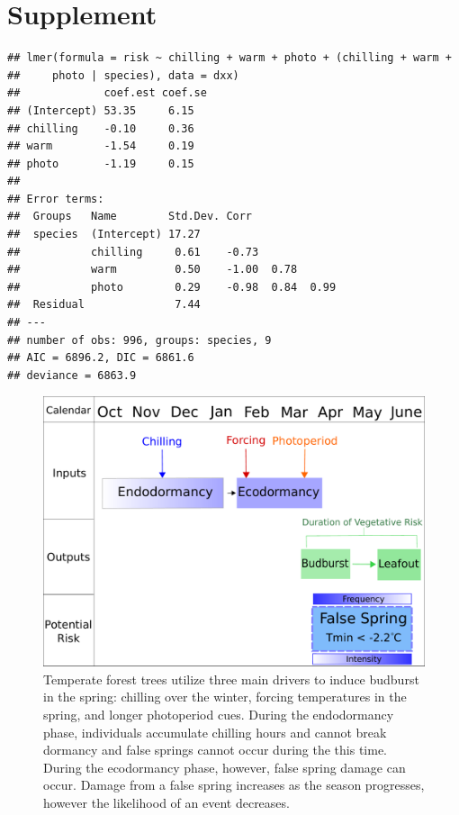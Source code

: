 \documentclass{article}\usepackage[]{graphicx}\usepackage[]{color}
\makeatletter
\newenvironment{kframe}{%
 \def\at@end@of@kframe{}%
 \ifinner\ifhmode%
  \def\at@end@of@kframe{\end{minipage}}%
  \begin{minipage}{\columnwidth}%
 \fi\fi%
 \def\FrameCommand##1{\hskip\@totalleftmargin \hskip-\fboxsep
 \colorbox{shadecolor}{##1}\hskip-\fboxsep
     \hskip-\linewidth \hskip-\@totalleftmargin \hskip\columnwidth}%
 \MakeFramed {\advance\hsize-\width
   \@totalleftmargin\z@ \linewidth\hsize
   \@setminipage}}%
 {\par\unskip\endMakeFramed%
 \at@end@of@kframe}
\newenvironment{knitrout}{}{} %
\makeatother
\begin{document}
\section*{Supplement}
\begin{knitrout}
\color{fgcolor}\begin{kframe}
\begin{verbatim}
## lmer(formula = risk ~ chilling + warm + photo + (chilling + warm + 
##     photo | species), data = dxx)
##             coef.est coef.se
## (Intercept) 53.35     6.15  
## chilling    -0.10     0.36  
## warm        -1.54     0.19  
## photo       -1.19     0.15  
## 
## Error terms:
##  Groups   Name        Std.Dev. Corr              
##  species  (Intercept) 17.27                      
##           chilling     0.61    -0.73             
##           warm         0.50    -1.00  0.78       
##           photo        0.29    -0.98  0.84  0.99 
##  Residual              7.44                      
## ---
## number of obs: 996, groups: species, 9
## AIC = 6896.2, DIC = 6861.6
## deviance = 6863.9
\end{verbatim}
\end{kframe}
\end{knitrout}

\begin{figure} [H] 
\begin{center}
\includegraphics{..//figure/CuesAndFS.pdf}
\caption{Temperate forest trees utilize three main drivers to induce budburst in the spring: chilling over the winter, forcing temperatures in the spring, and longer photoperiod cues. During the endodormancy phase, individuals accumulate chilling hours and cannot break dormancy and false springs cannot occur during the this time. During the ecodormancy phase, however, false spring damage can occur. Damage from a false spring increases as the season progresses, however the likelihood of an event decreases.}\label{fig:cues}
\end{center}
\end{figure}
\end{document}
